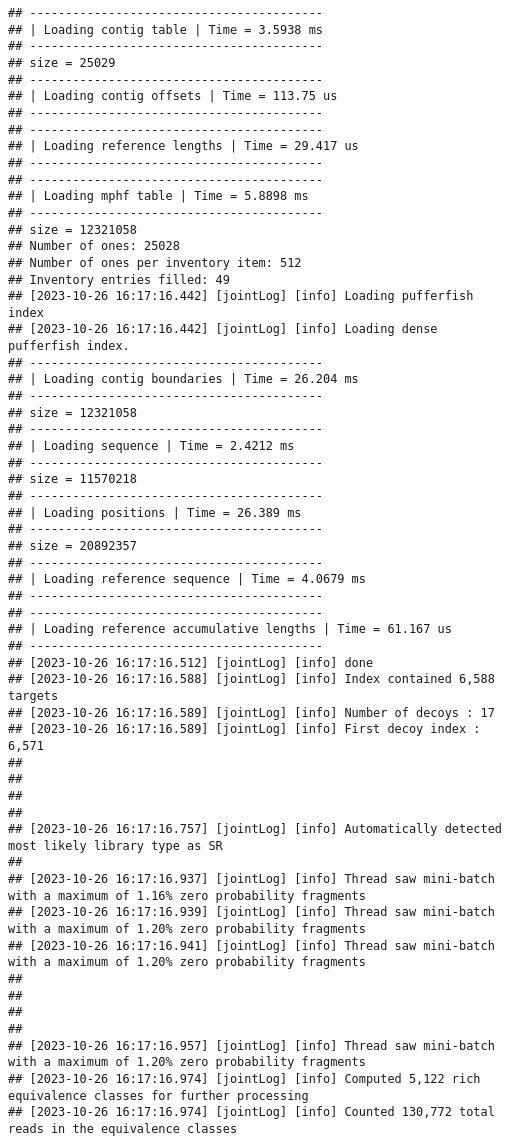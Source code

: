 \documentclass[
]{book}
\begin{document}
\begin{verbatim}
## -----------------------------------------
## | Loading contig table | Time = 3.5938 ms
## -----------------------------------------
## size = 25029
## -----------------------------------------
## | Loading contig offsets | Time = 113.75 us
## -----------------------------------------
## -----------------------------------------
## | Loading reference lengths | Time = 29.417 us
## -----------------------------------------
## -----------------------------------------
## | Loading mphf table | Time = 5.8898 ms
## -----------------------------------------
## size = 12321058
## Number of ones: 25028
## Number of ones per inventory item: 512
## Inventory entries filled: 49
## [2023-10-26 16:17:16.442] [jointLog] [info] Loading pufferfish index
## [2023-10-26 16:17:16.442] [jointLog] [info] Loading dense pufferfish index.
## -----------------------------------------
## | Loading contig boundaries | Time = 26.204 ms
## -----------------------------------------
## size = 12321058
## -----------------------------------------
## | Loading sequence | Time = 2.4212 ms
## -----------------------------------------
## size = 11570218
## -----------------------------------------
## | Loading positions | Time = 26.389 ms
## -----------------------------------------
## size = 20892357
## -----------------------------------------
## | Loading reference sequence | Time = 4.0679 ms
## -----------------------------------------
## -----------------------------------------
## | Loading reference accumulative lengths | Time = 61.167 us
## -----------------------------------------
## [2023-10-26 16:17:16.512] [jointLog] [info] done
## [2023-10-26 16:17:16.588] [jointLog] [info] Index contained 6,588 targets
## [2023-10-26 16:17:16.589] [jointLog] [info] Number of decoys : 17
## [2023-10-26 16:17:16.589] [jointLog] [info] First decoy index : 6,571 
## 
## 
## 
## 
## [2023-10-26 16:17:16.757] [jointLog] [info] Automatically detected most likely library type as SR
## 
## [2023-10-26 16:17:16.937] [jointLog] [info] Thread saw mini-batch with a maximum of 1.16% zero probability fragments
## [2023-10-26 16:17:16.939] [jointLog] [info] Thread saw mini-batch with a maximum of 1.20% zero probability fragments
## [2023-10-26 16:17:16.941] [jointLog] [info] Thread saw mini-batch with a maximum of 1.20% zero probability fragments
## 
## 
## 
## 
## [2023-10-26 16:17:16.957] [jointLog] [info] Thread saw mini-batch with a maximum of 1.20% zero probability fragments
## [2023-10-26 16:17:16.974] [jointLog] [info] Computed 5,122 rich equivalence classes for further processing
## [2023-10-26 16:17:16.974] [jointLog] [info] Counted 130,772 total reads in the equivalence classes 

\end{verbatim}
\end{document}
